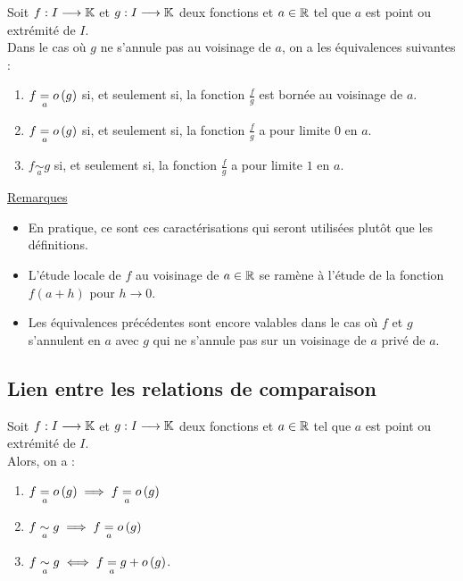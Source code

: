 \begin{defprop}
    Soit \(f : I \longrightarrow  \mathbb{K}\) et \(g : I \longrightarrow  \mathbb{K}\) deux fonctions et \(a \in  \mathbb{R}\) tel que \(a\) est point ou extrémité de \(I\).\\
    Dans le cas où \(g\) ne s’annule pas au voisinage de \(a\), on a les équivalences suivantes :
    \begin{enumerate}
        \item \(f \underset{a}{=} o \left(g\right)\) si, et seulement si, la fonction \(\frac{f}{g}\) est bornée au voisinage de \(a\).
        \item \(f \underset{a}{=} o \left(g\right)\) si, et seulement si, la fonction \(\frac{f}{g}\) a pour limite \(0\) en \(a\).
        \item \( f \underset{a}{\sim} g\) si, et seulement si, la fonction \(\frac{f}{g}\) a pour limite \(1\) en \(a\).
    \end{enumerate}
    \underline{Remarques}
    \begin{itemize}
        \item En pratique, ce sont ces caractérisations qui seront utilisées plutôt que les définitions.
        \item L’étude locale de \(f\) au voisinage de \(a \in  \mathbb{R} \) se ramène à l’étude de la fonction \(f (a + h)\) pour \(h \to  0\).
        \item Les équivalences précédentes sont encore valables dans le cas où \(f\) et \(g\) s’annulent en \(a\) avec \(g\) qui ne s’annule pas sur un voisinage de \(a\) privé de \(a\).
    \end{itemize}
\end{defprop}

\subsection{Lien entre les relations de comparaison}

\begin{defprop}
    Soit \(f : I \longrightarrow  \mathbb{K}\) et \(g : I \longrightarrow  \mathbb{K}\) deux fonctions et \(a \in  \mathbb{R}\) tel que \(a\) est point ou extrémité de \(I\).\\
    Alors, on a :
    \begin{enumerate}
        \item \(f \underset{a}{=} o \left(g\right) \implies f \underset{a}{=} o \left(g\right)\) 
        \item \(f \underset{a}{\sim} g \implies f \underset{a}{=} o \left(g\right)\) 
        \item \(f \underset{a}{\sim} g \iff f \underset{a}{=} g + o \left(g\right)\).
    \end{enumerate}

\end{defprop}

